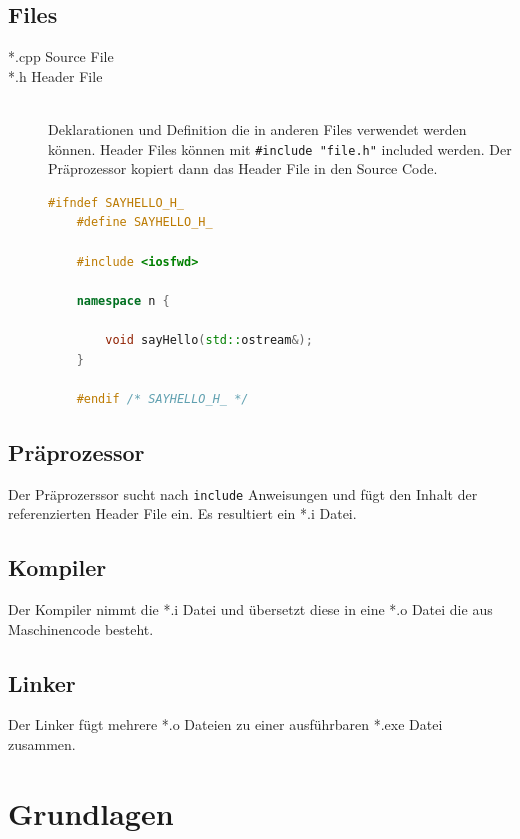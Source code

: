 \subsection{Files}
\begin{description}
	\item[*.cpp Source File]
	\item[*.h Header File] \hfill \\ Deklarationen und Definition die in anderen Files verwendet werden können. Header Files können mit \lstinline|#include "file.h"| included werden. Der Präprozessor kopiert dann das Header File in den Source Code. 
	\begin{lstlisting}[language=C++, caption=Basic Header File]
	#ifndef SAYHELLO_H_
	#define SAYHELLO_H_
	
	#include <iosfwd>
	
	namespace n {
	
		void sayHello(std::ostream&);
	}
		
	#endif /* SAYHELLO_H_ */
	\end{lstlisting}
\end{description}

\subsection{Präprozessor}
Der Präprozerssor sucht nach \lstinline|include| Anweisungen und fügt den Inhalt der referenzierten Header File ein. Es resultiert ein *.i Datei.

\subsection{Kompiler}
Der Kompiler nimmt die *.i Datei und übersetzt diese in eine *.o Datei die aus Maschinencode besteht.


\subsection{Linker}
Der Linker fügt mehrere *.o Dateien zu einer ausführbaren *.exe Datei zusammen.

\section{Grundlagen}
